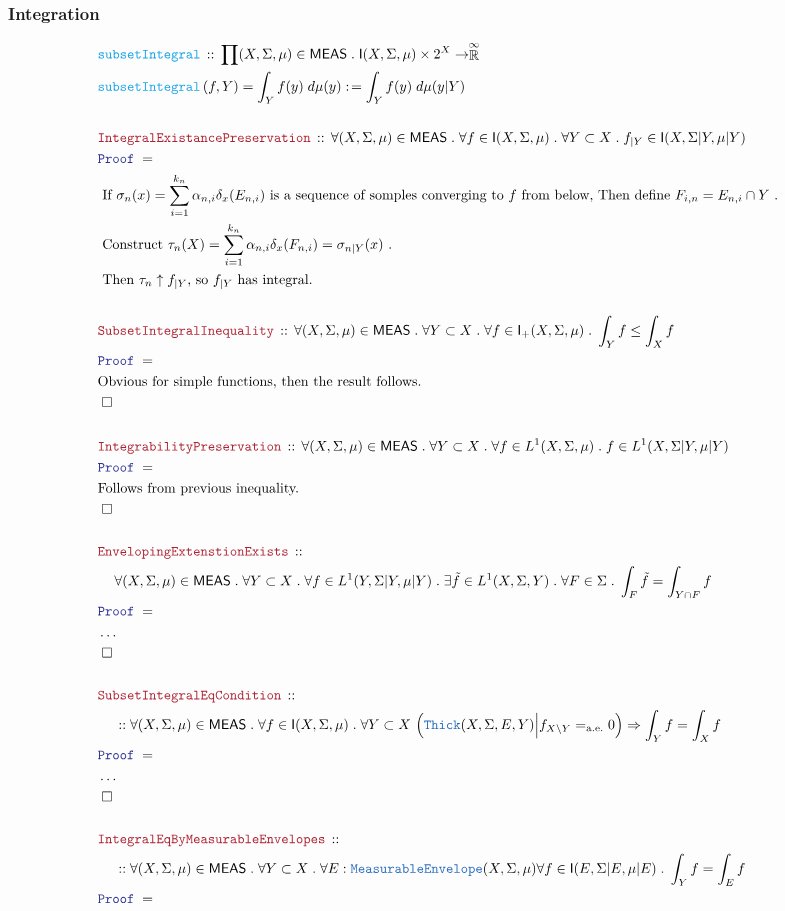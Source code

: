 \documentclass[12pt]{scrartcl}
\newcommand{\TYPE}[1]{\textcolor{NavyBlue}{\mathtt{#1}}}
\newcommand{\FUNC}[1]{\textcolor{Cerulean}{\mathtt{#1}}}
\newcommand{\LOGIC}[1]{\textcolor{Blue}{\mathtt{#1}}}
\newcommand{\THM}[1]{\textcolor{Maroon}{\mathtt{#1}}}
\renewcommand{\.}{\; . \;}
\newcommand{\de}{: \kern 0.1pc =}
\newcommand{\Act}[1]{\left( #1 \right)}
\newcommand{\Theorem}[2]{& \THM{#1} \, :: \, #2 \\ & \Proof = \\ }
\newcommand{\DeclareFunc}[2]{& \FUNC{#1} \, :: \, #2 \\}
\newcommand{\DefineNamedFunc}[4]{&  \FUNC{#1}\Act{#2} = #3 \de #4 \\}
\newcommand{\NewLine}{\\ & \kern 1pc}
\newcommand{\Page}[1]{ \begin{align*} #1 \end{align*}   }
\newcommand{\NoProof}{ & \ldots \\ \EndProof}
\newcommand{\Imply}{\Rightarrow}
\newcommand{\EReals}{\stackrel{\mathclap{\infty}}{\mathbb{R}}}
\newcommand{\QED}{\; \square}
\newcommand{\EndProof}{& \QED \\}
\newcommand{\Proof}{\LOGIC{Proof} \; }
\newcommand{\Explain}[1]{& \text{#1.} \\}
\renewcommand{\ae}{\mathrm{a.e.}}
\newcommand{\Thick}{\TYPE{Thick}}
\newcommand{\Integrable}{\mathsf{I}}
\newcommand{\ME}{\TYPE{MeasurableEnvelope}}
\newcommand{\MEAS}{\mathsf{MEAS}}
\begin{document}
\subsubsection{Integration}
\Page{
	\DeclareFunc{subsetIntegral}
	{
		\prod (X,\Sigma,\mu) \in \MEAS \.
		\Integrable(X,\Sigma,\mu) \times 2^X \to \EReals
	}
	\DefineNamedFunc{subsetIntegral}{f,Y}{\int_Y f(y) \; d\mu(y) }
	{
		\int_Y f(y) \; d \mu(y|Y)	
	}
	\\
	\Theorem{IntegralExistancePreservation}
	{
		\forall (X,\Sigma,\mu) \in \MEAS \.
		\forall f \in \Integrable(X,\Sigma,\mu) \.
		\forall Y \subset X \.
		f_{|Y} \in \Integrable(X,\Sigma|Y,\mu|Y)
	}
	\Explain{
		If $\sigma_n(x) = \sum^{k_n}_{i=1} \alpha_{n,i} \delta_x(E_{n,i}) $
		is a sequence of somples converging to $f$ from below,
		Then define $F_{i,n} = E_{n,i} \cap Y$ }
	\Explain{
		Construct $\tau_n(X) = \sum^{k_n}_{i=1} \alpha_{n,i} \delta_x(F_{n,i}) = \sigma_{n|Y}(x)$
	}
	\Explain{
		Then $\tau_n \uparrow f_{|Y}$, so $f_{|Y}$ has integral}
	\\
	\Theorem{SubsetIntegralInequality}{
		\forall (X,\Sigma, \mu) \in \MEAS \.
		\forall Y \subset X \.	
		\forall f \in \Integrable_+(X,\Sigma, \mu) \.
		\int_Y f \leq \int_X f
	}
	\Explain{Obvious for simple functions, then the result follows}
	\EndProof
	\\
	\Theorem{IntegrabilityPreservation}{
		\forall (X,\Sigma, \mu) \in \MEAS \.
		\forall Y \subset X \.	
		\forall f \in  L^1(X,\Sigma, \mu) \.
		f \in L^1(X,\Sigma|Y,\mu|Y)
	}
	\Explain{Follows from previous inequality}
	\EndProof
	\\
	\Theorem{EnvelopingExtenstionExists}
	{
		\NewLine		
		\forall (X,\Sigma,\mu) \in \MEAS \.
		\forall Y \subset X \.
		\forall f \in L^1(Y,\Sigma|Y,\mu|Y) \.
		\exists \tilde f \in L^1(X,\Sigma,Y) \.
		\forall F \in \Sigma \.
		\int_F \tilde f = \int_{Y \cap F} f
	}
	\NoProof
	\\
	\Theorem{SubsetIntegralEqCondition}
	{
		\NewLine ::		
		\forall (X,\Sigma,\mu) \in \MEAS \.
		\forall f \in \Integrable(X,\Sigma,\mu) \.
		\forall Y \subset X \
		\Big( \Thick(X,\Sigma,E,Y) \Big| f_{X\setminus Y} =_{\ae} 0 \Big)
		\Imply
		\int_Y f = \int_X f
	}
	\NoProof
	\\
	\Theorem{IntegralEqByMeasurableEnvelopes}
	{
		\NewLine ::		
		\forall (X,\Sigma,\mu) \in \MEAS \.
		\forall Y \subset X \.
		\forall E : \ME(X,\Sigma,\mu)
		\forall f \in \Integrable(E,\Sigma|E,\mu|E) \.
		\int_Y f = \int_E f
	}
}
\newpage
\end{document}

